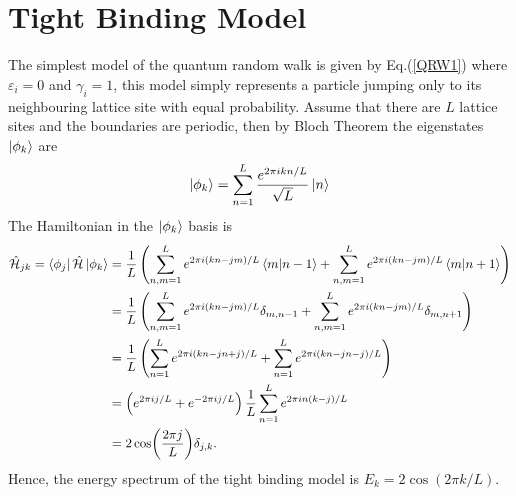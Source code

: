 \documentclass{article}
\numberwithin{equation}{section}
\renewcommand{\H}{\mathcal{\hat{H}}} %
\newcommand{\1}{\mathbb{1}}
\begin{document}
\section{Tight Binding Model}
The simplest model of the quantum random walk is given by Eq.(\ref{QRW1}) where $\varepsilon_i=0$ and $\gamma_i=1$, this model simply represents a particle jumping only to its neighbouring lattice site with equal probability. Assume that there are $L$ lattice sites and the boundaries are periodic, then by Bloch Theorem \cite{} the eigenstates $\ket{\phi_k}$ are
\begin{equation}
    \ket{\phi_k}=\sum_{n=1}^L \frac{e^{2\pi i kn/L}}{\sqrt{L}}\ket{n}
\end{equation}
The Hamiltonian in the $\ket{\phi_k}$ basis is
\begin{align}
    \H_{jk}=\bra{\phi_j}\H\ket{\phi_k}&=\frac{1}{L}\left(
    \sum_{n,m=1}^Le^{ 2\pi i (kn-jm)/L} \braket{m}{n-1}+\sum_{n,m=1}^L e^{2\pi i(kn-jm)/L}\braket{m}{n+1}
    \right)
    \\
    &=\frac{1}{L}\left(
    \sum_{n,m=1}^Le^{2\pi i (kn-jm)/L} \delta_{m,n-1}+\sum_{n,m=1}^L e^{2\pi i(kn-jm)/L} \delta_{m,n+1}
    \right)
    \\
    &=\frac{1}{L}\left(
    \sum_{n=1}^L e^{2\pi i(kn-jn+j)/L} + \sum_{n=1}^L e^{2\pi i (kn-jn-j)/L}
    \right)
    \\
    &=\left(e^{2\pi i j/L}+e^{-2\pi ij/L}\right)\frac{1}{L}\sum_{n=1}^L e^{2\pi i n (k-j)/L}
    \\
    &=2 \cos (\frac{2 \pi j}{L}) \delta_{j,k}.
\end{align}
Hence, the energy spectrum of the tight binding model is $E_k=2\cos(2\pi k/L)$.
\end{document}
